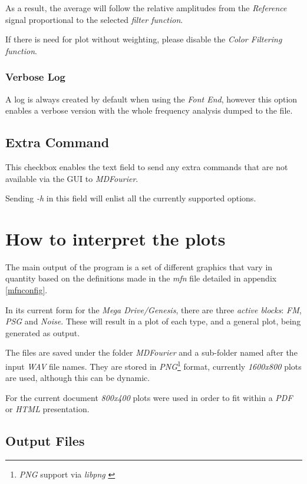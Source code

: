 \documentclass[10pt,a4paper]{report}
\begin{document}
As a result, the average will follow the relative amplitudes from the \textit{Reference} signal proportional to the selected \textit{filter function}.

If there is need for plot without weighting, please disable the \textit{Color Filtering function}.

\subsection{Verbose Log}

A log is always created by default when using the \textit{Font End}, however this option enables a verbose version with the whole frequency analysis dumped to the file.

\section{Extra Command}
\label{extracommand}

This checkbox enables the text field to send any extra commands that are not available via the GUI to \textit{MDFourier}. 

Sending \textit{-h} in this field will enlist all the currently supported options.

\chapter{How to interpret the plots}
\label{howtoplots}

The main output of the program is a set of different graphics that vary in quantity based on the definitions made in the \textit{mfn} file detailed in appendix \ref{mfnconfig}.

In its current form for the \textit{Mega Drive/Genesis}, there are three \textit{active blocks}: \textit{FM}, \textit{PSG} and \textit{Noise}. These will result in a plot of each type, and a general plot, being generated as output.

The files are saved under the folder \textit{MDFourier} and a sub-folder named after the input \textit{WAV} file names. They are stored in \textit{PNG}\footnote{\textit{PNG} support via \textit{libpng} \cite{libpng}} format, currently \textit{1600x800} plots are used, although this can be dynamic. 

For the current document \textit{800x400} plots were used in order to fit within a \textit{PDF} or \textit{HTML} presentation.

\section{Output Files}
\end{document}
